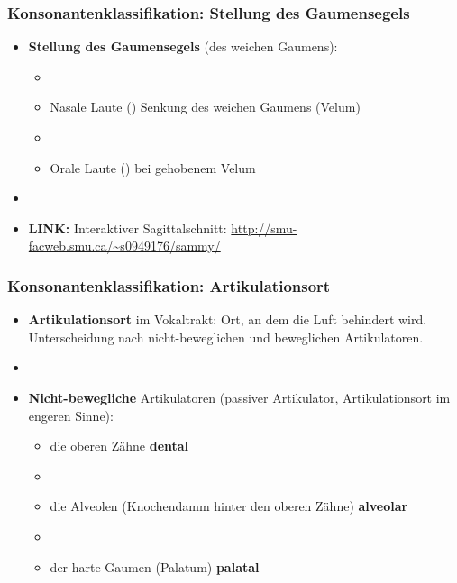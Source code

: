 
\begin{frame}
\frametitle{Konsonantenklassifikation: Stellung des Gaumensegels}

	\begin{itemize}
		\item \textbf{Stellung des Gaumensegels} (des weichen Gaumens):
		
		\begin{itemize}
			\item[]
			\item Nasale Laute (\zB \textipa{ [ m , n ]}) \ras Senkung des weichen Gaumens (Velum)
			\item[]
			\item Orale Laute (\zB \textipa{ [ f , a ]}) \ras bei gehobenem Velum
		\end{itemize}
		
		\item[]
		\item \textbf{LINK:} Interaktiver Sagittalschnitt: \url{http://smu-facweb.smu.ca/~s0949176/sammy/}
	\end{itemize}
	
\end{frame}



\begin{frame}
\frametitle{Konsonantenklassifikation: Artikulationsort}

	\begin{itemize}
	\item \textbf{Artikulationsort} im Vokaltrakt: Ort, an dem die Luft behindert wird.
          Unterscheidung nach nicht-beweglichen und beweglichen Artikulatoren.

		\item[]
		\item \textbf{Nicht-bewegliche} Artikulatoren (passiver Artikulator, Artikulationsort im engeren Sinne):
			
		\begin{itemize}
			\item die oberen Zähne \ras \textbf{dental}
			\item[]
			\item die Alveolen (Knochendamm hinter den oberen Zähne) \ras \textbf{alveolar}
			\item[]
			\item der harte Gaumen (Palatum) \ras \textbf{palatal}
		\end{itemize}
		
	\end{itemize}
	
\end{frame}


